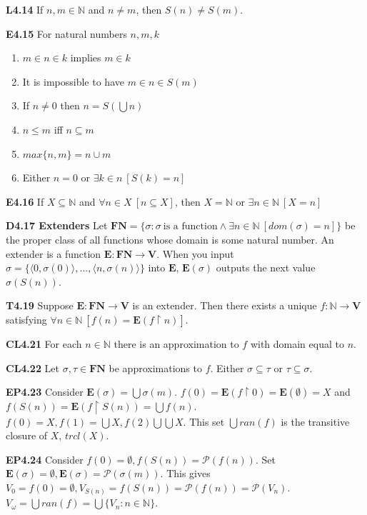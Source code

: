 \documentclass[10pt, landscape]{article}
\begin{document}
\begin{multicols*}{3}
\textbf{L4.14} If $n, m \in \mathbb{N}$ and $n \neq m$, then $S(n) \neq S(m)$.

\textbf{E4.15} For natural numbers $n, m, k$
\begin{enumerate}
    \item $m \in n \in k$ implies $m \in k$
    \item It is impossible to have $m \in n \in S(m)$
    \item If $n \neq 0$ then $n=S(\bigcup n)$
    \item $n \leq m$ iff $n \subseteq m$
    \item $max\{n, m\}=n \cup m$
    \item Either $n=0$ or $\exists k \in n \ [S(k)=n]$
\end{enumerate}

\textbf{E4.16} If $X \subseteq \mathbb{N}$ and $\forall n \in X \ [n \subseteq X]$, then $X=\mathbb{N}$ or $\exists n \in \mathbb{N} \ [X=n]$

\textbf{D4.17 Extenders} Let $\mathbf{FN}=\{\sigma:\sigma \ \text{is a function}\land \exists n \in \mathbb{N} \ [dom(\sigma)=n]\}$ be the proper class of all functions whose domain is some natural number. An extender is a function $\mathbf{E:FN\rightarrow V}$. When you input $\sigma=\{\langle 0, \sigma(0) \rangle, ...,\langle n, \sigma(n) \rangle\}$ into $\mathbf{E}$, $\mathbf{E}(\sigma)$ outputs the next value $\sigma(S(n))$.

\textbf{T4.19} Suppose $\mathbf{E:FN\rightarrow V}$ is an extender. Then there exists a unique $f:\mathbb{N}\rightarrow \mathbf{V}$ satisfying $\forall n \in \mathbb{N} \ [f(n)=\mathbf{E}(f \restriction n)]$.

\textbf{CL4.21} For each $n \in \mathbb{N}$ there is an approximation to $f$ with domain equal to $n$.

\textbf{CL4.22} Let $\sigma, \tau \in \mathbf{FN}$ be approximations to $f$. Either $\sigma \subseteq \tau$ or $\tau \subseteq \sigma$.

\textbf{EP4.23} Consider $\mathbf{E}(\sigma)=\bigcup\sigma(m)$. $f(0) = \mathbf{E}(f \restriction 0)=\mathbf{E}(\emptyset)=X$ and $f(S(n))=\mathbf{E}(f \restriction S(n)) = \bigcup f(n)$. $f(0)=X, f(1) = \bigcup X, f(2) \bigcup \bigcup X$. This set $\bigcup ran(f)$ is the transitive closure of $X$, $tr cl(X)$.

\textbf{EP4.24} Consider $f(0)=\emptyset, f(S(n))=\mathcal{P}(f(n))$. Set $\mathbf{E}(\sigma)=\emptyset, \mathbf{E}(\sigma)=\mathcal{P}(\sigma(m))$. This gives $V_0=f(0) = \emptyset, V_{S(n)}=f(S(n))=\mathcal{P}(f(n))=\mathcal{P}(V_n)$. $V_\omega=\bigcup ran(f)=\bigcup\{V_n: n \in \mathbb{N}\}$.


\end{multicols*}
\end{document}
